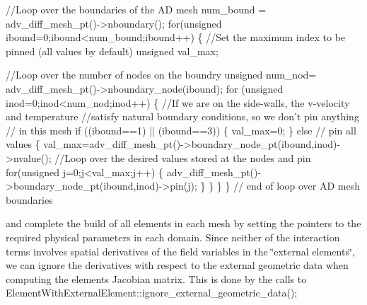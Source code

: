 \begin{DoxyCodeInclude}
 \textcolor{comment}{//Loop over the boundaries of the AD mesh}
 num\_bound = adv\_diff\_mesh\_pt()->nboundary();
 \textcolor{keywordflow}{for}(\textcolor{keywordtype}{unsigned} ibound=0;ibound<num\_bound;ibound++)
  \{
   \textcolor{comment}{//Set the maximum index to be pinned (all values by default)}
   \textcolor{keywordtype}{unsigned} val\_max;

   \textcolor{comment}{//Loop over the number of nodes on the boundry}
   \textcolor{keywordtype}{unsigned} num\_nod= adv\_diff\_mesh\_pt()->nboundary\_node(ibound);
   \textcolor{keywordflow}{for} (\textcolor{keywordtype}{unsigned} inod=0;inod<num\_nod;inod++)
    \{
     \textcolor{comment}{//If we are on the side-walls, the v-velocity and temperature}
     \textcolor{comment}{//satisfy natural boundary conditions, so we don't pin anything}
     \textcolor{comment}{// in this mesh}
     \textcolor{keywordflow}{if} ((ibound==1) || (ibound==3)) 
      \{
       val\_max=0;
      \}
     \textcolor{keywordflow}{else} \textcolor{comment}{// pin all values}
      \{
       val\_max=adv\_diff\_mesh\_pt()->boundary\_node\_pt(ibound,inod)->nvalue();
       \textcolor{comment}{//Loop over the desired values stored at the nodes and pin}
       \textcolor{keywordflow}{for}(\textcolor{keywordtype}{unsigned} j=0;j<val\_max;j++)
        \{
         adv\_diff\_mesh\_pt()->boundary\_node\_pt(ibound,inod)->pin(j);
        \}
      \}
    \}
  \} \textcolor{comment}{// end of loop over AD mesh boundaries}

\end{DoxyCodeInclude}


and complete the build of all elements in each mesh by setting the pointers to the required physical parameters in each domain. Since neither of the interaction terms involves spatial derivatives of the field variables in the \char`\"{}external elements\char`\"{}, we can ignore the derivatives with respect to the external geometric data when computing the element\textquotesingle{}s Jacobian matrix. This is done by the calls to {\ttfamily Element\+With\+External\+Element\+::ignore\+\_\+external\+\_\+geometric\+\_\+data()};



